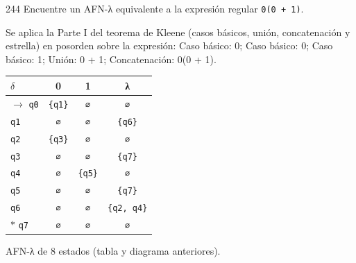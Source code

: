\documentclass[11pt]{article}
\begin{document}
\begin{ejercicio}{244}{}
Encuentre un AFN-λ equivalente a la expresión regular \texttt{0(0 + 1)}.
\end{ejercicio}
\proc Se aplica la Parte I del teorema de Kleene (casos básicos, unión, concatenación y estrella) en posorden sobre la expresión: Caso básico: 0; Caso básico: 0; Caso básico: 1; Unión: 0 + 1; Concatenación: 0(0 + 1).
\begin{center}\small\begin{tabular}{lccc}\toprule
$\delta$ & 0 & 1 & λ \\\midrule
$\to$ \texttt{q0} & \texttt{\{q1\}} & \texttt{∅} & \texttt{∅} \\
 \texttt{q1} & \texttt{∅} & \texttt{∅} & \texttt{\{q6\}} \\
 \texttt{q2} & \texttt{\{q3\}} & \texttt{∅} & \texttt{∅} \\
 \texttt{q3} & \texttt{∅} & \texttt{∅} & \texttt{\{q7\}} \\
 \texttt{q4} & \texttt{∅} & \texttt{\{q5\}} & \texttt{∅} \\
 \texttt{q5} & \texttt{∅} & \texttt{∅} & \texttt{\{q7\}} \\
 \texttt{q6} & \texttt{∅} & \texttt{∅} & \texttt{\{q2, q4\}} \\
$*$ \texttt{q7} & \texttt{∅} & \texttt{∅} & \texttt{∅} \\
\bottomrule\end{tabular}\end{center}

\resp AFN-λ de 8 estados (tabla y diagrama anteriores).
\end{document}
